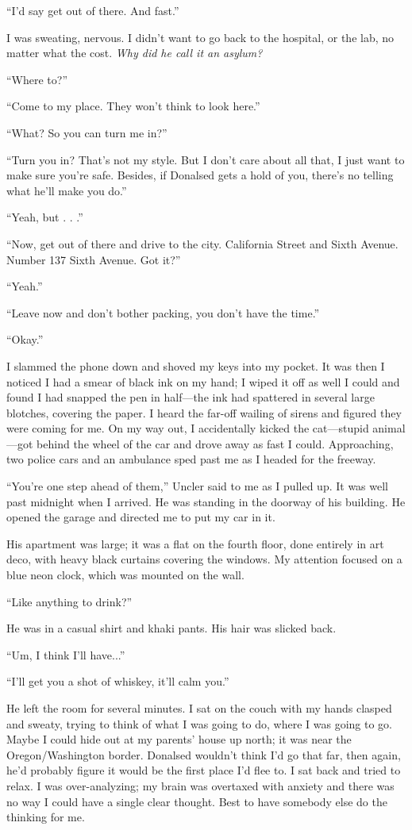 \documentclass[
]{article}
\begin{document}
``I'd say get out of there. And fast.''

I was sweating, nervous. I didn't want to go back to the hospital, or
the lab, no matter what the cost. \emph{Why did he call it an asylum?}

``Where to?''

``Come to my place. They won't think to look here.''

``What? So you can turn me in?''

``Turn you in? That's not my style. But I don't care about all that, I
just want to make sure you're safe. Besides, if Donalsed gets a hold of
you, there's no telling what he'll make you do.''

``Yeah, but . . .''

``Now, get out of there and drive to the city. California Street and
Sixth Avenue. Number 137 Sixth Avenue. Got it?''

``Yeah.''

``Leave now and don't bother packing, you don't have the time.''

``Okay.''

I slammed the phone down and shoved my keys into my pocket. It was then
I noticed I had a smear of black ink on my hand; I wiped it off as well
I could and found I had snapped the pen in half---the ink had spattered
in several large blotches, covering the paper. I heard the far-off
wailing of sirens and figured they were coming for me. On my way out, I
accidentally kicked the cat---stupid animal---got behind the wheel of
the car and drove away as fast I could. Approaching, two police cars and
an ambulance sped past me as I headed for the freeway.

``You're one step ahead of them,'' Uncler said to me as I pulled up. It
was well past midnight when I arrived. He was standing in the doorway of
his building. He opened the garage and directed me to put my car in it.

His apartment was large; it was a flat on the fourth floor, done
entirely in art deco, with heavy black curtains covering the windows. My
attention focused on a blue neon clock, which was mounted on the wall.

``Like anything to drink?''

He was in a casual shirt and khaki pants. His hair was slicked back.

``Um, I think I'll have...''

``I'll get you a shot of whiskey, it'll calm you.''

He left the room for several minutes. I sat on the couch with my hands
clasped and sweaty, trying to think of what I was going to do, where I
was going to go. Maybe I could hide out at my parents' house up north;
it was near the Oregon/Washington border. Donalsed wouldn't think I'd go
that far, then again, he'd probably figure it would be the first place
I'd flee to. I sat back and tried to relax. I was over-analyzing; my
brain was overtaxed with anxiety and there was no way I could have a
single clear thought. Best to have somebody else do the thinking for me.
\end{document}
